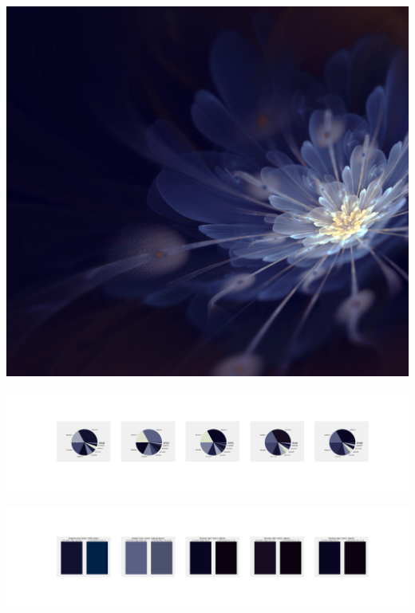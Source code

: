 \documentclass[11pt]{article}
\begin{document}
\begin{landscape}
    \begin{center}
    \includegraphics[width=\textwidth]{./nbimg/file (181).jpg}
    \end{center}

    \begin{center}
    \includegraphics[width=250mm]{./nbimg/pie-91.jpg}
    \end{center}

    \begin{center}
    \includegraphics[width=250mm]{./nbimg/peak-91.jpg}
    \end{center}
    


\end{landscape}
\end{document}
